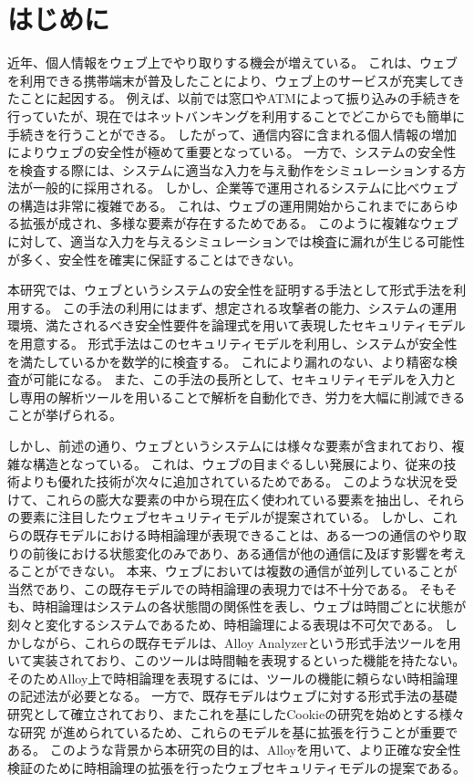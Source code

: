 \documentclass[12pt,a4paper]{jbook}
\begin{document}
\chapter{はじめに}
近年、個人情報をウェブ上でやり取りする機会が増えている。
これは、ウェブを利用できる携帯端末が普及したことにより、ウェブ上のサービスが充実してきたことに起因する。
例えば、以前では窓口やATMによって振り込みの手続きを行っていたが、現在ではネットバンキングを利用することでどこからでも簡単に手続きを行うことができる。
したがって、通信内容に含まれる個人情報の増加によりウェブの安全性が極めて重要となっている。
一方で、システムの安全性を検査する際には、システムに適当な入力を与え動作をシミュレーションする方法が一般的に採用される。
しかし、企業等で運用されるシステムに比べウェブの構造は非常に複雑である。
これは、ウェブの運用開始からこれまでにあらゆる拡張が成され、多様な要素が存在するためである。
このように複雑なウェブに対して、適当な入力を与えるシミュレーションでは検査に漏れが生じる可能性が多く、安全性を確実に保証することはできない。

本研究では、ウェブというシステムの安全性を証明する手法として形式手法を利用する。
この手法の利用にはまず、想定される攻撃者の能力、システムの運用環境、満たされるべき安全性要件を論理式を用いて表現したセキュリティモデルを用意する。
形式手法はこのセキュリティモデルを利用し、システムが安全性を満たしているかを数学的に検査する。
これにより漏れのない、より精密な検査が可能になる。
また、この手法の長所として、セキュリティモデルを入力とし専用の解析ツールを用いることで解析を自動化でき、労力を大幅に削減できることが挙げられる。

しかし、前述の通り、ウェブというシステムには様々な要素が含まれており、複雑な構造となっている。
これは、ウェブの目まぐるしい発展により、従来の技術よりも優れた技術が次々に追加されているためである。
このような状況を受けて、これらの膨大な要素の中から現在広く使われている要素を抽出し、それらの要素に注目したウェブセキュリティモデルが提案されている\cite{based-model,cookie-model}。
しかし、これらの既存モデルにおける時相論理が表現できることは、ある一つの通信のやり取りの前後における状態変化のみであり、ある通信が他の通信に及ぼす影響を考えることができない。
本来、ウェブにおいては複数の通信が並列していることが当然であり、この既存モデルでの時相論理の表現力では不十分である。
そもそも、時相論理はシステムの各状態間の関係性を表し、ウェブは時間ごとに状態が刻々と変化するシステムであるため、時相論理による表現は不可欠である。
しかしながら、これらの既存モデル\cite{based-model,cookie-model}は、Alloy Analyzerという形式手法ツールを用いて実装されており、このツールは時間軸を表現するといった機能を持たない。
そのためAlloy上で時相論理を表現するには、ツールの機能に頼らない時相論理の記述法が必要となる。
一方で、既存モデル\cite{based-model}はウェブに対する形式手法の基礎研究として確立されており、またこれを基にしたCookieの研究\cite{cookie-model}を始めとする様々な研究
\color{red}
\cite{chaitanya2017formal, bagheri2016practical, chen2015aspire, nelson2013aluminum, somorovsky2011all}
\color{black}
が進められているため、これらのモデルを基に拡張を行うことが重要である。
このような背景から本研究の目的は、Alloyを用いて、より正確な安全性検証のために時相論理の拡張を行ったウェブセキュリティモデルの提案である。
\end{document}
